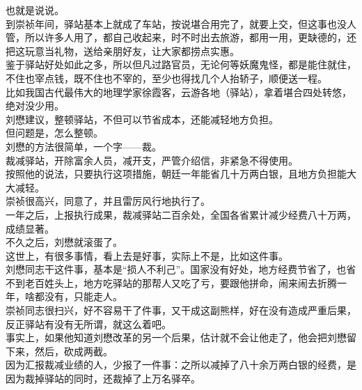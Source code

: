 \begin{multicols}{\theparacolNo}
也就是说说。\\

到崇祯年间，驿站基本上就成了车站，按说堪合用完了，就要上交，但这事也没人管，所以许多人用了，都自己收起来，时不时出去旅游，都用一用，更缺德的，还把这玩意当礼物，送给亲朋好友，让大家都捞点实惠。\\

鉴于驿站好处如此之多，所以但凡过路官员，无论何等妖魔鬼怪，都是能住就住，不住也宰点钱，既不住也不宰的，至少也得找几个人抬轿子，顺便送一程。\\

比如我国古代最伟大的地理学家徐霞客，云游各地（驿站），拿着堪合四处转悠，绝对没少用。\\

刘懋建议，整顿驿站，不但可以节省成本，还能减轻地方负担。\\

但问题是，怎么整顿。\\

刘懋的方法很简单，一个字——裁。\\

裁减驿站，开除富余人员，减开支，严管介绍信，非紧急不得使用。\\

按照他的说法，只要执行这项措施，朝廷一年能省几十万两白银，且地方负担能大大减轻。\\

崇祯很高兴，同意了，并且雷厉风行地执行了。\\

一年之后，上报执行成果，裁减驿站二百余处，全国各省累计减少经费八十万两，成绩显著。\\

不久之后，刘懋就滚蛋了。\\

这世上，有很多事情，看上去是好事，实际上不是，比如这件事。\\

刘懋同志干这件事，基本是“损人不利己”。国家没有好处，地方经费节省了，也省不到老百姓头上，地方吃驿站的那帮人又吃了亏，要跟他拼命，闹来闹去折腾一年，啥都没有，只能走人。\\

崇祯同志很扫兴，好不容易干了件事，又干成这副熊样，好在没有造成严重后果，反正驿站有没有无所谓，就这么着吧。\\

事实上，如果他知道刘懋改革的另一个后果，估计就不会让他走了，他会把刘懋留下来，然后，砍成两截。\\

因为汇报裁减业绩的人，少报了一件事：之所以减掉了八十余万两白银的经费，是因为裁掉驿站的同时，还裁掉了上万名驿卒。\\


\end{multicols}

